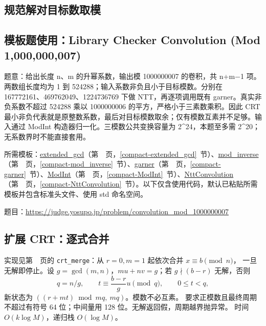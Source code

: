 

\Needspace{180pt}

\subsection*{规范解对目标数取模}



\Needspace{552pt}

\subsection*{模板题使用：Library Checker Convolution (Mod 1,000,000,007)}

\label{usage-example-213}

题意：给出长度 n、m 的升幂系数，输出模 1000000007 的卷积，共 n+m−1 项。两数组长度均为 1 到 524288；输入系数非负且小于目标模数。分别在 167772161、469762049、1224736769 下做 NTT，再逐项调用既有 garner。真实非负系数不超过 524288 乘以 1000000006 的平方，严格小于三素数乘积。因此 CRT 最小非负代表就是原整数系数，最后对目标模数取余；仅有模数互素并不足够。输入通过 ModInt 构造器归一化。三模数公共变换容量为 2\textasciicircum{}24，本题至多需 2\textasciicircum{}20；无系数界时不能直接套用。

所需模板：\hyperref[compact-extended_gcd]{extended\_\allowbreak{}gcd}（第~\pageref{compact-extended_gcd}~页，\ref{compact-extended_gcd}~节）、\hyperref[compact-mod_inverse]{mod\_\allowbreak{}inverse}（第~\pageref{compact-mod_inverse}~页，\ref{compact-mod_inverse}~节）、\hyperref[compact-garner]{garner}（第~\pageref{compact-garner}~页，\ref{compact-garner}~节）、\hyperref[compact-ModInt]{ModInt}（第~\pageref{compact-ModInt}~页，\ref{compact-ModInt}~节）、\hyperref[compact-NttConvolution]{NttConvolution}（第~\pageref{compact-NttConvolution}~页，\ref{compact-NttConvolution}~节）。以下仅含使用代码，默认已粘贴所需模板并包含标准头文件、使用 std 命名空间。

题目：\url{https://judge.yosupo.jp/problem/convolution_mod_1000000007}



\subsection{扩展 CRT：逐式合并}\label{knowledge-excrt}
实现见第~\pageref{compact-crt_merge}~页的 \texttt{crt\_merge}：从 $r=0,m=1$ 起依次合并 $x\equiv b\pmod n$，
一旦无解即停止。设 $g=\gcd(m,n)$，$mu+nv=g$；若 $g\nmid(b-r)$ 无解，否则
\[
q=n/g,\qquad t\equiv\frac{b-r}{g}u\pmod q,\qquad 0\le t<q,
\]
新状态为 $((r+mt)\bmod mq,\ mq)$。模数不必互素。
要求正模数且最终周期不超过有符号 64 位；中间量用 128 位。无解返回假，周期越界抛异常。
时间 $O(k\log M)$，递归栈 $O(\log M)$。



